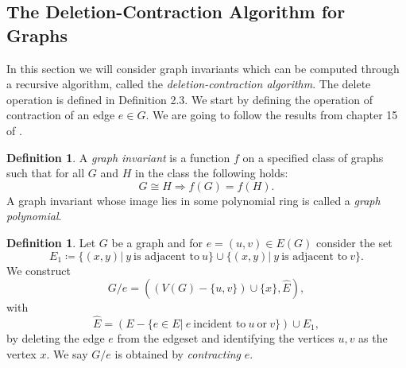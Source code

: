 \documentclass[12pt,a4paper, twoside, autooneside=false]{scrartcl}
\theoremstyle{definition}
\newtheorem{definition}[theorem]{Definition}
\theoremstyle{remark}
\numberwithin{equation}{section}
\begin{document}
\subsection{The Deletion-Contraction Algorithm for Graphs}
In this section we will consider graph invariants which can be computed through a recursive algorithm, called the \textit{deletion-contraction algorithm}. The delete operation is defined in Definition 2.3. We start by defining the operation of contraction of an edge $e \in G$. We are going to follow the results from chapter 15 of \cite{GoRo2001}.
\begin{definition}
A \textit{graph invariant} is a function $f$ on a specified class of graphs such that for all $G$ and $H$ in the class the following holds:
\[
G \cong H \Longrightarrow f(G) = f(H).
\] 
A graph invariant whose image lies in some polynomial ring is called a \textit{graph polynomial}.
\end{definition}
\begin{definition}
Let $G$ be a graph and for $e = (u,v) \in E(G)$ consider the set 
\[
E_1 \coloneqq \{(x,y) | \ y  \ \text{is adjacent to} \ u\} \cup \{(x,y) | \ y  \ \text{is adjacent to} \ v\}.
\] We construct 
\[
G / e = ((V(G) - \{u,v\}) \cup \{x\} , \hat{E}),
\] with 
\[ \hat{E} = \left(E - \{e \in E | \ e \ \text{incident to} \ u \  \text{or} \ v\}\right) \cup E_1, \]
by deleting the edge $e$ from the edgeset and identifying the vertices $u,v$ as the vertex $x$. We say $G / e$ is obtained by \textit{contracting} $e$. 
\end{definition}
\end{document}
